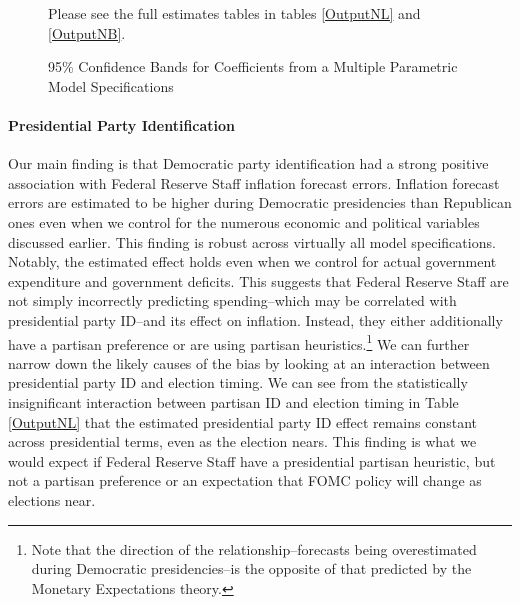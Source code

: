 \documentclass[a4paper]{article}\usepackage[]{graphicx}\usepackage[]{color}
\makeatletter
\newenvironment{kframe}{%
 \def\at@end@of@kframe{}%
 \ifinner\ifhmode%
  \def\at@end@of@kframe{\end{minipage}}%
  \begin{minipage}{\columnwidth}%
 \fi\fi%
 \def\FrameCommand##1{\hskip\@totalleftmargin \hskip-\fboxsep
 \colorbox{shadecolor}{##1}\hskip-\fboxsep
     \hskip-\linewidth \hskip-\@totalleftmargin \hskip\columnwidth}%
 \MakeFramed {\advance\hsize-\width
   \@totalleftmargin\z@ \linewidth\hsize
   \@setminipage}}%
 {\par\unskip\endMakeFramed%
 \at@end@of@kframe}
\newenvironment{knitrout}{}{} %
\makeatother
\begin{document}
\begin{figure}[t]
    \caption{95\% Confidence Bands for Coefficients from a Multiple Parametric Model Specifications}
    \label{CoefComparePlots}
    \begin{center}

\begin{knitrout}
\color{fgcolor}\begin{kframe}


{\ttfamily\noindent\bfseries\color{errorcolor}{\#\# Error: client error: (404) Not Found}}\end{kframe}
\end{knitrout}

    \end{center}
    \begin{singlespace}
        {\scriptsize{Please see the full estimates tables in tables \ref{OutputNL} and \ref{OutputNB}.}}
    \end{singlespace}
\end{figure}

\paragraph{Presidential Party Identification}

Our main finding is that Democratic party identification had a strong positive association with Federal Reserve Staff inflation forecast errors. Inflation forecast errors are estimated to be higher during Democratic presidencies than Republican ones even when we control for the numerous economic and political variables discussed earlier. This finding is robust across virtually all model specifications. Notably, the estimated effect holds even when we control for actual government expenditure and government deficits. This suggests that Federal Reserve Staff are not simply incorrectly predicting spending--which may be correlated with presidential party ID--and its effect on inflation. Instead, they either additionally have a partisan preference or are using partisan heuristics.\footnote{Note that the direction of the relationship--forecasts being overestimated during Democratic presidencies--is the opposite of that predicted by the Monetary Expectations theory.} We can further narrow down the likely causes of the bias by looking at an interaction between presidential party ID and election timing. We can see from the statistically insignificant interaction between partisan ID and election timing in Table \ref{OutputNL} that the estimated presidential party ID effect remains constant across presidential terms, even as the election nears. This finding is what we would expect if Federal Reserve Staff have a presidential partisan heuristic, but not a partisan preference or an expectation that FOMC policy will change as elections near.
\end{document}
